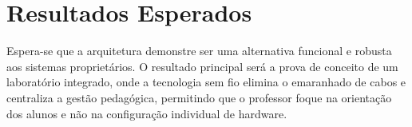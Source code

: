 \chapter{Resultados Esperados}

Espera-se que a arquitetura demonstre ser uma alternativa funcional e robusta aos sistemas proprietários. O resultado principal será a prova de conceito de um laboratório integrado, onde a tecnologia sem fio elimina o emaranhado de cabos e centraliza a gestão pedagógica, permitindo que o professor foque na orientação dos alunos e não na configuração individual de hardware.
